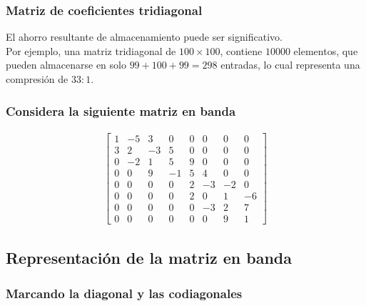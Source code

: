 \begin{frame}
\frametitle{Matriz de coeficientes tridiagonal}
El ahorro resultante de almacenamiento puede ser significativo.
\\
\bigskip
Por ejemplo, una matriz tridiagonal de $100 \times 100$, contiene $10000$ elementos, que pueden almacenarse en solo $99+100+99=298$ entradas, lo cual representa una compresión de $33:1$.
\end{frame}
\begin{frame}[plain]
\frametitle{Considera la siguiente matriz en banda}
\fontsize{12}{12}\selectfont
\begin{align*}
\begin{bmatrix}
1 & -5 & 3 & 0 & 0 & 0 & 0 & 0 \\
3 & 2 & -3 & 5 & 0 & 0 & 0 & 0 \\
0 & -2 & 1 & 5 & 9 & 0 & 0 & 0 \\
0 & 0 & 9 & -1 & 5 & 4 & 0 & 0 \\
0 & 0 & 0 & 0 & 2 & -3 & -2 & 0 \\
0 & 0 & 0 & 0 & 2 & 0 & 1 & -6 \\
0 & 0 & 0 & 0 & 0 & -3 & 2 & 7 \\
0 & 0 & 0 & 0 & 0 & 0 & 9 & 1 
\end{bmatrix}
\end{align*}
\end{frame}
\subsection{Representación de la matriz en banda}
\begin{frame}[plain]
\frametitle{Marcando la diagonal y las codiagonales}
\begin{figure}
    \centering
        
\end{figure}
\end{frame}
